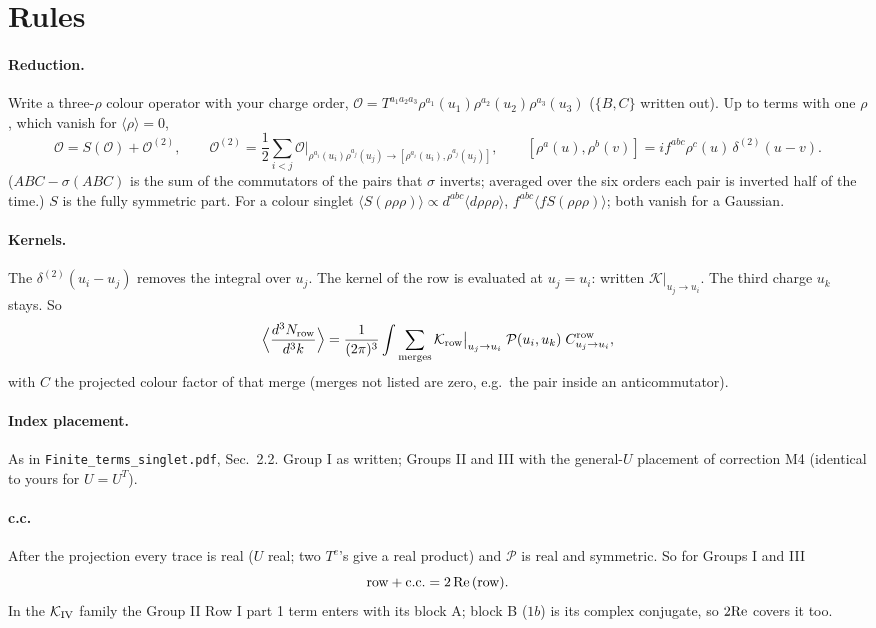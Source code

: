 \documentclass[10pt]{article}
\numberwithin{equation}{section}
\newcommand{\PP}{\mathcal P}
\newcommand{\OO}{\mathcal O}
\begin{document}
\section{Rules}\label{GS:sec:rules}
\paragraph{Reduction.} Write a three-$\rho$ colour operator with your charge order, $\OO=T^{a_1a_2a_3}\rho^{a_1}(u_1)\rho^{a_2}(u_2)\rho^{a_3}(u_3)$ ($\{B,C\}$ written out). Up to terms with one $\rho$, which vanish for $\langle\rho\rangle=0$,
\begin{equation}
\OO=S(\OO)+\OO^{(2)},\qquad \OO^{(2)}=\frac12\sum_{i<j}\OO\Big|_{\rho^{a_i}(u_i)\rho^{a_j}(u_j)\to[\rho^{a_i}(u_i),\rho^{a_j}(u_j)]},\qquad[\rho^a(u),\rho^b(v)]=if^{abc}\rho^c(u)\,\delta^{(2)}(u-v).
\end{equation}
($ABC-\sigma(ABC)$ is the sum of the commutators of the pairs that $\sigma$ inverts; averaged over the six orders each pair is inverted half of the time.) $S$ is the fully symmetric part. For a colour singlet $\langle S(\rho\rho\rho)\rangle\propto d^{abc}\langle d\rho\rho\rho\rangle$, $f^{abc}\langle fS(\rho\rho\rho)\rangle$; both vanish for a Gaussian.
\paragraph{Kernels.} The $\delta^{(2)}(u_i-u_j)$ removes the integral over $u_j$. The kernel of the row is evaluated at $u_j=u_i$: written $\mathcal K\big|_{u_j\to u_i}$. The third charge $u_k$ stays. So
\begin{equation}
\Big\langle\frac{d^3N_{\rm row}}{d^3k}\Big\rangle=\frac{1}{(2\pi)^3}\int\sum_{\rm merges}\mathcal K_{\rm row}\big|_{u_j\to u_i}\;\PP(u_i,u_k)\;C^{\rm row}_{u_j\to u_i},\label{GS:eq:three}
\end{equation}
with $C$ the projected colour factor of that merge (merges not listed are zero, e.g.\ the pair inside an anticommutator).
\paragraph{Index placement.} As in \texttt{Finite\_terms\_singlet.pdf}, Sec.~2.2. Group I as written; Groups II and III with the general-$U$ placement of correction M4 (identical to yours for $U=U^T$).
\paragraph{c.c.} After the projection every trace is real ($U$ real; two $T^e$'s give a real product) and $\PP$ is real and symmetric. So for Groups I and III
\begin{equation}
\text{row}+{\rm c.c.}=2\,{\rm Re}\,(\text{row}).
\end{equation}
In the $\mathcal K_{\rm IV}$ family the Group II Row I part 1 term enters with its block A; block B ($1b$) is its complex conjugate, so $2{\rm Re}$ covers it too.
\end{document}
